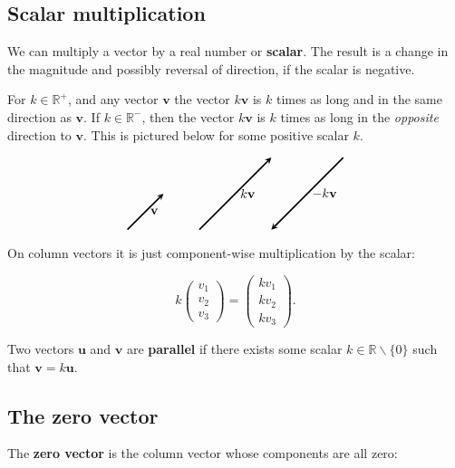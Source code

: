 \documentclass[a4paper,12pt]{amsart}
\begin{document}
    \subsection{Scalar multiplication}

    We can multiply a vector by a real number or \textbf{scalar}. The result is a change in the magnitude and possibly reversal of direction, if the scalar is negative. 
    
    For $k \in \mathbb{R}^+$, and any vector $\mathbf{v}$ the vector $k \mathbf{v}$ is $k$ times as long and in the same direction as $\mathbf{v}$. If $k \in \mathbb{R}^-$, then the vector $k \mathbf{v}$ is $k$ times as long in the \emph{opposite} direction to $\mathbf{v}$. This is pictured below for some positive scalar $k$.

    \[
        \begin{tikzpicture}[vector/.style={-stealth,very thick}]
            \coordinate (A) at (0,0);
            \coordinate (B) at (1,1);
            \coordinate (C) at (2,0);
            \coordinate (D) at (4,2);
            \coordinate (E) at (4,0);
            \coordinate (F) at (6,2);
            \draw[vector] (A) -- (B) node[midway, right] {$\mathbf{v}$};
            \draw[vector] (C) -- (D) node[midway, right] {$k \mathbf{v}$};
            \draw[vector] (F) -- (E) node[midway, right] {$-k \mathbf{v}$};
        \end{tikzpicture}
    \]

    On column vectors it is just component-wise multiplication by the scalar:

    \[ k \begin{pmatrix} v_1 \\ v_2 \\ v_3 \end{pmatrix} = \begin{pmatrix} k v_1 \\ k v_2 \\ k v_3 \end{pmatrix}. \]

    Two vectors $\mathbf{u}$ and $\mathbf{v}$ are \textbf{parallel} if there exists some scalar $k \in \mathbb{R} \backslash \{ 0 \}$ such that $\mathbf{v} = k \mathbf{u}$.

    \subsection{The zero vector}

    The \textbf{zero vector} is the column vector whose components are all zero:
\end{document}
